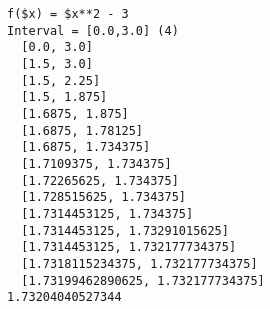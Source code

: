 \begin{verbatim}
f($x) = $x**2 - 3
Interval = [0.0,3.0] (4)
  [0.0, 3.0]
  [1.5, 3.0]
  [1.5, 2.25]
  [1.5, 1.875]
  [1.6875, 1.875]
  [1.6875, 1.78125]
  [1.6875, 1.734375]
  [1.7109375, 1.734375]
  [1.72265625, 1.734375]
  [1.728515625, 1.734375]
  [1.7314453125, 1.734375]
  [1.7314453125, 1.73291015625]
  [1.7314453125, 1.732177734375]
  [1.7318115234375, 1.732177734375]
  [1.73199462890625, 1.732177734375]
1.73204040527344
\end{verbatim}
